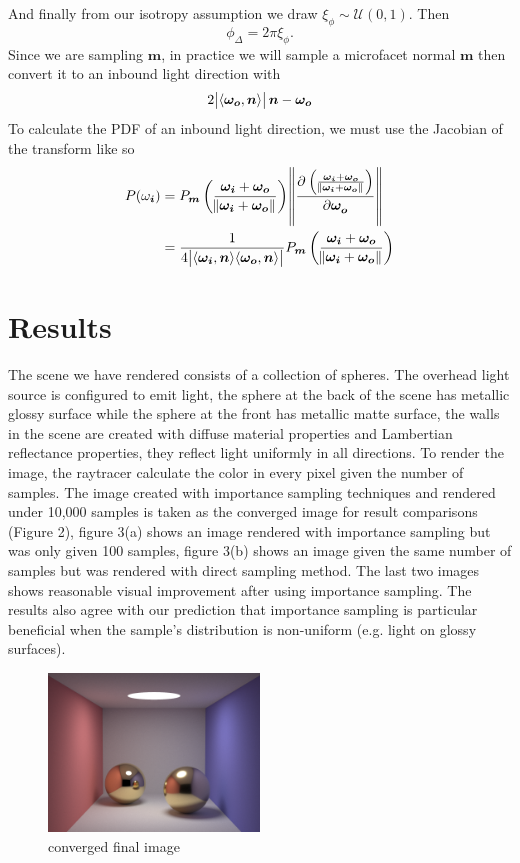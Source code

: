 \documentclass[12pt]{article}
\DeclarePairedDelimiter\ip{\langle }{\rangle}
\begin{document}
And finally from our isotropy assumption we draw \(\xi_\phi \sim \mathcal{U}(0, 1)\).
Then
\[\phi_\Delta = 2\pi\xi_\phi .\]
Since we are sampling \(\bm m\), in practice we will sample a microfacet normal \( \bm m\) then convert it to an inbound light direction with \autocite{taylor_2016}
\[2\abs{\ip{\bm{\omega_o}, \bm n}}\bm n-  \bm{\omega_o}\]
To calculate the PDF of an inbound light direction, we must use the Jacobian of the transform like so
\begin{align*}
  P(\omega_{\bm i}) &= P_{\bm m}\del{\frac{\bm{\omega_i} + \bm{\omega_o}}{\norm{\bm{\omega_i} + \bm{\omega_o}}} } \norm{\dpd{\del{\frac{\bm{\omega_i} + \bm{\omega_o}}{\norm{\bm{\omega_i} + \bm{\omega_o}}}}}{\bm{\omega_o}}}\\
   &= \frac{1}{4\abs{\ip{\bm{\omega_i}, \bm n}\ip{\bm{\omega_o}, \bm n}}}P_{\bm m}\del{\frac{\bm{\omega_i} + \bm{\omega_o}}{\norm{\bm{\omega_i} + \bm{\omega_o}}} }
\end{align*}
\section{Results}
The scene we have rendered consists of a collection of spheres. The overhead light source is configured to emit light, the sphere at the back of the scene has metallic glossy surface while the sphere at the front has metallic matte surface, the walls in the scene are created with diffuse material properties and Lambertian reflectance properties, they reflect light uniformly in all directions. To render the image, the raytracer calculate the color in every pixel given the number of samples. The image created with importance sampling techniques and rendered under 10,000 samples is taken as the converged image for result comparisons (Figure 2), figure 3(a) shows an image rendered with importance sampling but was only given 100 samples, figure 3(b) shows an image given the same number of samples but was rendered with direct sampling method. The last two images shows reasonable visual improvement after using importance sampling. The results also agree with our prediction that importance sampling is particular beneficial when the sample's distribution is non-uniform (e.g. light on glossy surfaces).

\begin{figure}[ht]
  \centering
    \includegraphics[width=0.5\textwidth]{convergedIS.png}
    \caption{converged final image}
\end{figure}
\end{document}

